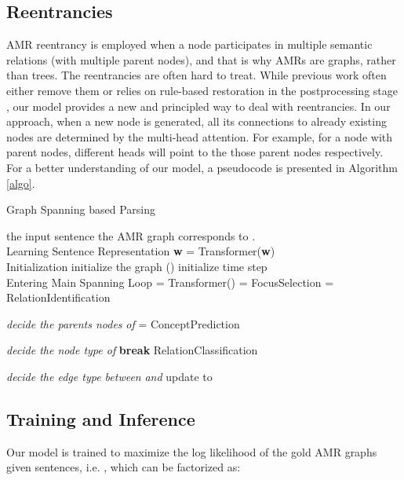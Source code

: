 \documentclass[11pt,a4paper]{article}
\begin{document}
	\subsection{Reentrancies}
    \noindent AMR reentrancy is employed when a node participates in multiple semantic relations (with multiple parent nodes), and that is why AMRs are graphs, rather than trees. The reentrancies are often hard to treat. While previous work often either remove them \cite{guo2018better} or relies on rule-based restoration in the postprocessing stage \cite{lyu2018amr,van2017neural}, our model provides a new and principled way to deal with reentrancies. In our approach, when a new node is generated, all its connections to already existing nodes are determined by the multi-head attention. For example, for a node with  parent nodes,  different heads will point to the those parent nodes respectively. For a better understanding of our model, a pseudocode is presented in Algorithm \ref{algo}.
    	 \begin{algorithm}[t]
    	\caption{Graph Spanning based Parsing}
    	\begin{algorithmic}[1]
    		\REQUIRE the input sentence 
    		\ENSURE the AMR graph  corresponds to .\\
    		 Learning Sentence Representation
    		\STATE \textbf{w} = 
    		\STATE  Transformer(\textbf{w})\\
    		 Initialization
    		\STATE initialize the graph  ()
    		\STATE initialize time step \\
    		 Entering Main Spanning Loop
    		\STATE  = Transformer()
    		\STATE  = FocusSelection 
    		\STATE  = RelationIdentification 
    		\item \textit{decide the parents nodes}  \textit{of} 
    		\STATE  = ConceptPrediction 
    		\item \textit{decide the node type of }
    		\IF { }
    		\STATE \textbf{break}
    		\ENDIF
    		\FOR{ }
    		\STATE RelationClassification 
    		\item \textit{decide the edge type between}  \textit{and} 
    		\ENDFOR
    		\STATE update  to 
    		\ENDWHILE
    		\RETURN 
    	\end{algorithmic}
    	\label{algo}
    \end{algorithm}
	\subsection{Training and Inference}
	Our model is trained to maximize the log likelihood of the gold AMR graphs given sentences, i.e. , which can be factorized as:
	
\end{document}
